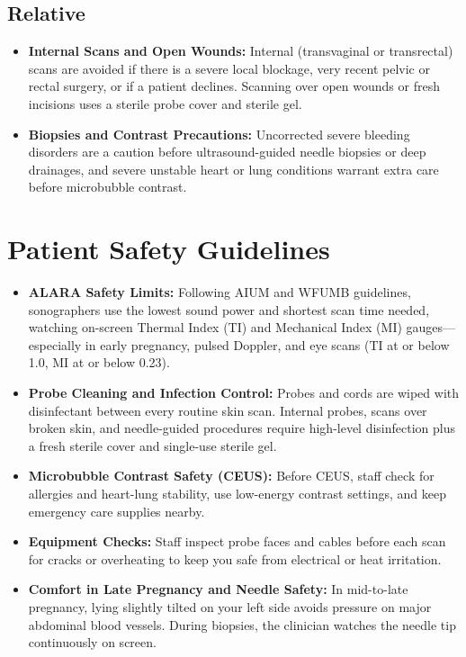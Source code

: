 \subsection{Relative}

\begin{itemize}
    \item \textbf{Internal Scans and Open Wounds:} Internal (transvaginal or transrectal) scans are avoided if there is a severe local blockage, very recent pelvic or rectal surgery, or if a patient declines. Scanning over open wounds or fresh incisions uses a sterile probe cover and sterile gel.
    \item \textbf{Biopsies and Contrast Precautions:} Uncorrected severe bleeding disorders are a caution before ultrasound-guided needle biopsies or deep drainages, and severe unstable heart or lung conditions warrant extra care before microbubble contrast.
\end{itemize}

\section{Patient Safety Guidelines}

\begin{itemize}
    \item \textbf{ALARA Safety Limits:} Following AIUM and WFUMB guidelines, sonographers use the lowest sound power and shortest scan time needed, watching on-screen Thermal Index (TI) and Mechanical Index (MI) gauges---especially in early pregnancy, pulsed Doppler, and eye scans (TI at or below 1.0, MI at or below 0.23).
    \item \textbf{Probe Cleaning and Infection Control:} Probes and cords are wiped with disinfectant between every routine skin scan. Internal probes, scans over broken skin, and needle-guided procedures require high-level disinfection plus a fresh sterile cover and single-use sterile gel.
    \item \textbf{Microbubble Contrast Safety (CEUS):} Before CEUS, staff check for allergies and heart-lung stability, use low-energy contrast settings, and keep emergency care supplies nearby.
    \item \textbf{Equipment Checks:} Staff inspect probe faces and cables before each scan for cracks or overheating to keep you safe from electrical or heat irritation.
    \item \textbf{Comfort in Late Pregnancy and Needle Safety:} In mid-to-late pregnancy, lying slightly tilted on your left side avoids pressure on major abdominal blood vessels. During biopsies, the clinician watches the needle tip continuously on screen.
\end{itemize}

